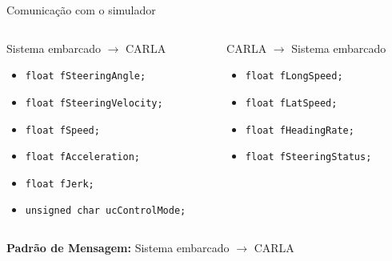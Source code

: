 \documentclass{if-beamer}
\begin{document}
\begin{frame}{Comunicação com o simulador}
	
	\begin{columns}
		
		\begin{column}{0.435\textwidth}
			
			\begin{block}{Sistema embarcado $\longrightarrow$ CARLA}
				
				\begin{itemize}
					\item \texttt{float fSteeringAngle;}
					\item \texttt{float fSteeringVelocity;}
					\item \texttt{float fSpeed;}
					\item \texttt{float fAcceleration;}
					\item \texttt{float fJerk;}	
					\item \texttt{unsigned char ucControlMode;}					
				\end{itemize}
				
			\end{block}
			
		\end{column}
		
		\begin{column}{0.435\textwidth}
			
			\begin{block}{CARLA $\longrightarrow$ Sistema embarcado }
				
				\begin{itemize}
					\item \texttt{float fLongSpeed;}
					\item \texttt{float fLatSpeed;}
					\item \texttt{float fHeadingRate;}
					\item \texttt{float fSteeringStatus;}
					
				\end{itemize}
			
				
				
			\end{block}
			
		\end{column}
		
	\end{columns}

	\begin{block}{}
		
		\textbf{Padrão de Mensagem:} Sistema embarcado $\longrightarrow$ CARLA
		

\end{block}
\end{frame}
\end{document}
